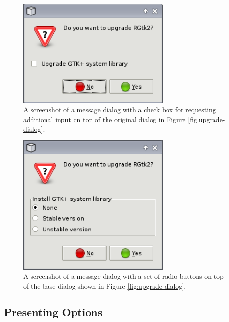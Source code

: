 \documentclass[article]{jss}
\begin{document}
\begin{figure}
\begin{center}
\includegraphics[width=3in]{checkbox-dialog.png}
\caption{\label{fig:checkbox-dialog}A screenshot of a message dialog with a 
check box for requesting additional input on top of the
original dialog in Figure \ref{fig:upgrade-dialog}.}
\end{center}
\end{figure}

\begin{figure}
\begin{center}
\includegraphics[width=3in]{radio-dialog.png}
\caption{\label{fig:radio-dialog}A screenshot of a message dialog with a set of
radio buttons on top of the base dialog shown in Figure \ref{fig:upgrade-dialog}.}
\end{center}
\end{figure}

\subsection{Presenting Options}
\end{document}
